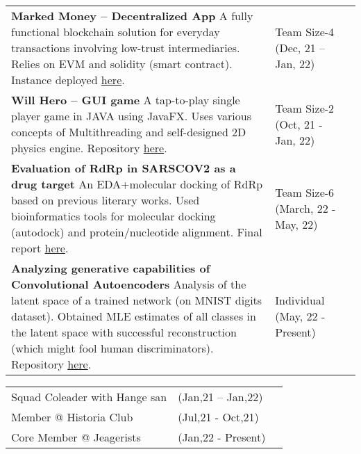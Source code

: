 \documentclass[10pt]{extarticle}
\begin{document}
\vspace{0pt}
\begin{contained}
\begin{longtable}{p{}p{}p{}}
    \textbf{Marked Money – Decentralized App}\newline
    A fully functional blockchain solution for everyday transactions
    involving low-trust intermediaries. Relies on EVM and solidity (smart contract).
    Instance deployed \href{https://moyemoye/}{here}.
    &Team Size-4
    \newline (Dec, 21 – Jan, 22)\\
    \textbf{Will Hero – GUI game}\newline
    A tap-to-play single player game in JAVA using JavaFX. Uses various
    concepts of Multithreading and self-designed 2D physics engine. Repository \href{https://github.com/vibsterD/CSE201-AP-Project}{here}.
    &Team Size-2
    \newline (Oct, 21 - Jan, 22)\\
    \textbf{Evaluation of RdRp in SARSCOV2 as a drug target}\newline
    An EDA+molecular docking of RdRp based on previous literary works. Used
    bioinformatics tools for molecular docking (autodock) and protein/nucleotide
    alignment. Final report \href{https://anindya-prithvi.github.io/filehost/PB_Project.pdf}{here}.
    &Team Size-6
    \newline (March, 22 - May, 22)\\
    \textbf{Analyzing generative capabilities of Convolutional Autoencoders}\newline
    Analysis of the latent space of a trained network (on MNIST digits dataset). Obtained MLE estimates of all classes in the latent space with successful reconstruction (which might fool human discriminators). Repository \href{https://github.com/Anindya-Prithvi/MNIST_CAELatentSpace}{here}.
    &Individual
    \newline (May, 22 - Present)\\
\end{longtable}
\end{contained}
\vspace{0pt}
\begin{contained}
\begin{longtable}{p{}p{}p{}}
    Squad Coleader with Hange san & (Jan,21 – Jan,22)\\
    Member @ Historia Club & (Jul,21 - Oct,21)\\
    Core Member @ Jeagerists & (Jan,22 - Present)\\
\end{longtable}
\vspace{0pt}
\end{contained}
\end{document}
